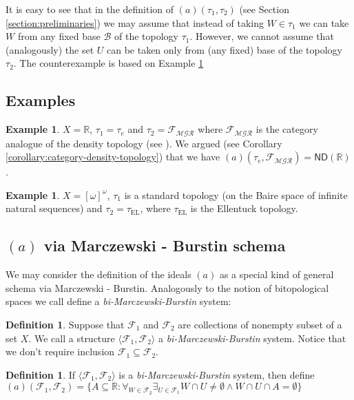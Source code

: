 \documentclass[12pt]{amsart}
\theoremstyle{plain}
\theoremstyle{definition}
\newtheorem{definition}[theorem]{Definition}
\newtheorem{example}[theorem]{Example}
\theoremstyle{remark}
\newcommand{\meager}{{\mathcal{MGR}}}
\newcommand{\real}{\mathbb{R}}
\newcommand{\cB}{{\mathcal B}}
\newcommand{\cF}{{\mathcal F}}
\newcommand{\aideal}{\mathit{(a)}}
\newcommand{\biMB}{bi-Marczewski-Burstin}
\newcommand{\tauEllentuck}{\tau_{\mathrm{EL}}}
\begin{document}
It is easy to see that in the definition of $\aideal(\tau_1, \tau_2)$
(see Section \ref{section:preliminaries})
we may assume that instead of taking $W \in \tau_1$
we can take $W$ from any fixed base $\cB$ of the topology
$\tau_1$. However, we cannot assume that (analogously)
the set $U$ can be taken only from (any fixed) base of
the topology $\tau_2$. The counterexample is based 
on Example \ref{example:ellentuck}

\subsection{Examples}
\begin{example}
$X = \real$,
$\tau_1 = \tau_e$ and
$\tau_2 = \cF_{\meager}$
where $\cF_{\meager}$ is the category analogue of the density topology (see \cite{PWBW}).
We argued (see Corollary \ref{corollary:category-density-topology}) that we have 
$(a)(\tau_e, \cF_{\meager}) = \mathsf{ND}(\real)$.
\end{example}
\begin{example}
\label{example:ellentuck}
$X = [\omega]^\omega$,
$\tau_1$ is a standard topology (on the Baire space of infinite natural sequences) and
$\tau_2 = \tauEllentuck$, where $\tauEllentuck$ is the Ellentuck topology.
\end{example}

\subsection{$\aideal$ via Marczewski - Burstin schema}

We may consider the definition of the ideals $\aideal$
as a special kind of general schema via Marczewski - Burstin.
Analogously to the notion of bitopological spaces we call define
a {\it\biMB{}} system:

\begin{definition}
Suppose that $\cF_1$ and $\cF_2$ are collections of nonempty
subset of a set $X$. 
We call a structure $\langle \cF_1, \cF_2 \rangle$ a {\it\biMB{}} system.
Notice that we don't require inclusion $\cF_1 \subseteq \cF_2$.
\end{definition}

\begin{definition}
If $\langle \cF_1, \cF_2 \rangle$ is a {\it\biMB{}} system,
then define 
$\aideal(\cF_1, \cF_2) = \lbrace A \subseteq \real\colon 
\forall_{W\in \cF_2} \exists_{U \in \cF_1}
W \cap U \not= \emptyset \wedge W \cap U \cap A = \emptyset
\rbrace$ 
\end{definition}
\end{document}
